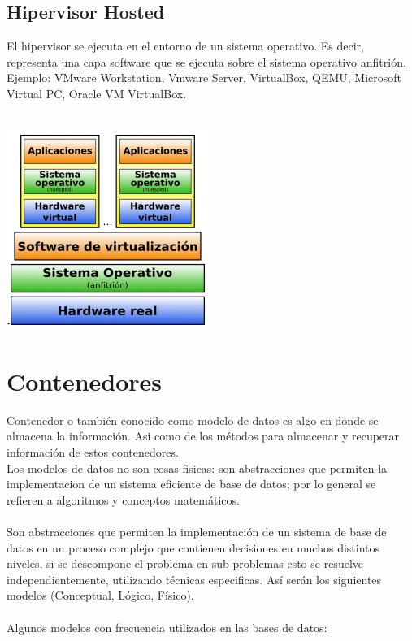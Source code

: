 \documentclass[12pt,letterpaper]{article}
\begin{document}
\subsection{Hipervisor Hosted}
El hipervisor se ejecuta en el entorno de un sistema operativo. Es decir, representa una capa software que se ejecuta sobre el sistema operativo anfitrión. \\
Ejemplo: VMware Workstation, Vmware Server, VirtualBox, QEMU, Microsoft Virtual PC, Oracle VM VirtualBox. \\ \\

\begin{center} 
\includegraphics[scale=1]{IMAGENES/hosted.png} 
\end{center}

\section{Contenedores} 

Contenedor o también conocido como modelo de datos es algo en donde se almacena la información. Asi como de los métodos para almacenar y recuperar información de estos contenedores. \\
Los modelos de datos no son cosas fisicas: son abstracciones que permiten la implementacion de un sistema eficiente de base de datos; por lo general se refieren a algoritmos y conceptos matemáticos. \\ \\
Son abstracciones que permiten la implementación de un sistema de base de datos en un proceso complejo que contienen decisiones en muchos distintos niveles, si se descompone el problema en sub problemas esto se resuelve independientemente, utilizando técnicas especificas. Así serán los siguientes  modelos (Conceptual, Lógico, Físico). \\ \\
Algunos modelos con frecuencia utilizados en las bases de datos: \\ \\
\end{document}
